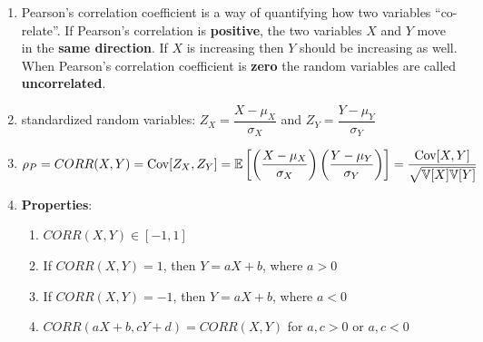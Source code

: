\begin{enumerate}
    \item Pearson’s correlation coefficient is a way of quantifying how two variables “co-relate”. 
    If Pearson’s correlation is \textbf{positive}, the two variables $X$ and $Y$ move in the \textbf{same direction}. 
    If $X$ is increasing then $Y$ should be increasing as well.
    When Pearson’s correlation coefficient is \textbf{zero} the random variables are called \textbf{uncorrelated}.
    \hfill \cite{statistics/book/Statistics-for-Data-Scientists/Maurits-Kaptein}

    \item standardized random variables: $Z_X = \dfrac{X - \mu_X }{\sigma_X}$ and $Z_Y = \dfrac{Y - \mu_Y }{\sigma_Y}$
    \hfill \cite{statistics/book/Statistics-for-Data-Scientists/Maurits-Kaptein}

    \item 
    $
        \rho_P 
        = CORR(X, Y ) 
        = \text{Cov}[Z_X , Z_Y] 
        = \mathbb{E}\left[\left(\dfrac{X - \mu_X }{\sigma_X}\right) \left(\dfrac{Y - \mu_Y}{ \sigma_Y}\right)\right] 
        = \dfrac{\text{Cov}[X, Y]}{\sqrt{\mathbb{V}[X] \mathbb{V}[Y] }}
    $
    \hfill \cite{statistics/book/Statistics-for-Data-Scientists/Maurits-Kaptein}

    \item \textbf{Properties}:
    \begin{enumerate}
        \item $CORR(X, Y ) \in [-1, 1]$
        \hfill \cite{statistics/book/Statistics-for-Data-Scientists/Maurits-Kaptein}
        
        \item If $CORR(X, Y ) = 1$, then $Y = a X + b$, where $a > 0$
        \hfill \cite{statistics/book/Statistics-for-Data-Scientists/Maurits-Kaptein}
        
        \item If $CORR(X, Y ) = -1$, then $Y = a X + b$, where $a < 0$
        \hfill \cite{statistics/book/Statistics-for-Data-Scientists/Maurits-Kaptein}
        
        \item $CORR(a X + b, cY + d) = CORR(X, Y )$ for $a, c > 0$ or $a, c < 0$
        \hfill \cite{statistics/book/Statistics-for-Data-Scientists/Maurits-Kaptein}
    \end{enumerate}
\end{enumerate}

